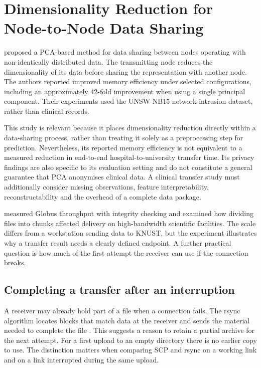 \section{Dimensionality Reduction for Node-to-Node Data Sharing}\label{dimensionality-reduction-for-node-to-node-data-sharing}

\citet{LeeShinLee2025} proposed a PCA-based method for data sharing between
nodes operating with non-identically distributed data. The transmitting
node reduces the dimensionality of its data before sharing the
representation with another node. The authors reported improved memory
efficiency under selected configurations, including an approximately
42-fold improvement when using a single principal component. Their
experiments used the UNSW-NB15 network-intrusion dataset, rather than
clinical records.

\noindent This study is relevant because it places dimensionality reduction
directly within a data-sharing process, rather than treating it solely
as a preprocessing step for prediction. Nevertheless, its reported
memory efficiency is not equivalent to a measured reduction in
end-to-end hospital-to-university transfer time. Its privacy findings
are also specific to its evaluation setting and do not constitute a
general guarantee that PCA anonymises clinical data. A clinical transfer
study must additionally consider missing observations, feature
interpretability, reconstructability and the overhead of a complete data
package.

\noindent \citet{Zheng2024} measured Globus throughput with integrity checking and examined how dividing files into chunks affected delivery on high-bandwidth scientific facilities. The scale differs from a workstation sending data to KNUST, but the experiment illustrates why a transfer result needs a clearly defined endpoint. A further practical question is how much of the first attempt the receiver can use if the connection breaks.

\subsection{Completing a transfer after an interruption}
A receiver may already hold part of a file when a connection fails. The rsync algorithm locates blocks that match data at the receiver and sends the material needed to complete the file \citep{TridgellMackerras1996}. This suggests a reason to retain a partial archive for the next attempt. For a first upload to an empty directory there is no earlier copy to use. The distinction matters when comparing SCP and rsync on a working link and on a link interrupted during the same upload.

